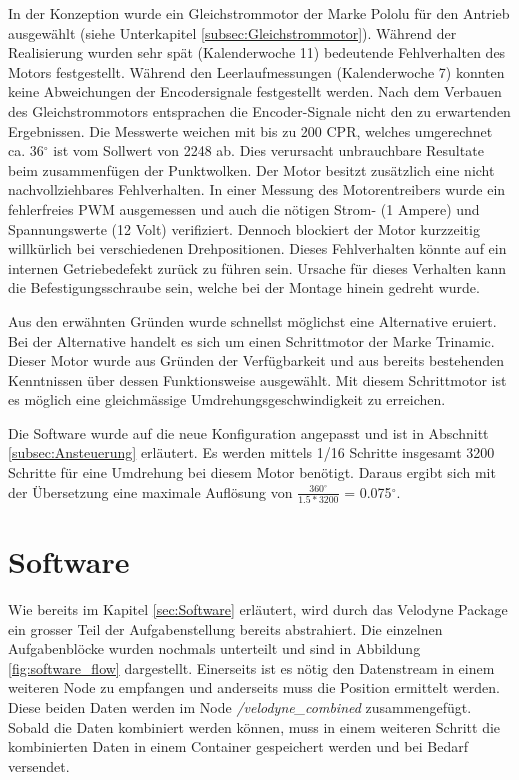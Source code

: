 In der Konzeption wurde ein Gleichstrommotor der Marke Pololu für den Antrieb ausgewählt (siehe Unterkapitel \ref{subsec:Gleichstrommotor}). Während der Realisierung wurden sehr spät (Kalenderwoche 11) bedeutende Fehlverhalten des Motors festgestellt. Während den Leerlaufmessungen (Kalenderwoche 7) konnten keine Abweichungen der Encodersignale festgestellt werden. Nach dem Verbauen des Gleichstrommotors entsprachen die Encoder-Signale nicht den zu erwartenden Ergebnissen. Die Messwerte weichen mit bis zu 200 \ac{CPR}, welches umgerechnet ca. 36$^\circ$ ist vom Sollwert von 2248 ab. Dies verursacht unbrauchbare Resultate beim zusammenfügen der Punktwolken. Der Motor besitzt zusätzlich eine nicht nachvollziehbares Fehlverhalten. In einer Messung des Motorentreibers wurde ein fehlerfreies \ac{PWM} ausgemessen und auch die nötigen Strom- (1 Ampere) und Spannungswerte (12 Volt) verifiziert. Dennoch blockiert der Motor kurzzeitig willkürlich bei verschiedenen Drehpositionen. Dieses Fehlverhalten könnte auf ein internen Getriebedefekt zurück zu führen sein. Ursache für dieses Verhalten kann die Befestigungsschraube sein, welche bei der Montage hinein gedreht wurde. 

Aus den erwähnten Gründen wurde schnellst möglichst eine Alternative eruiert. Bei der Alternative handelt es sich um einen Schrittmotor der Marke Trinamic. Dieser Motor wurde aus Gründen der Verfügbarkeit und aus bereits bestehenden Kenntnissen über dessen Funktionsweise ausgewählt. Mit diesem Schrittmotor ist es möglich eine gleichmässige Umdrehungsgeschwindigkeit zu erreichen. 

Die Software wurde auf die neue Konfiguration angepasst und ist in Abschnitt \ref{subsec:Ansteuerung} erläutert. Es werden mittels 1/16 Schritte insgesamt 3200 Schritte für eine Umdrehung bei diesem Motor benötigt. Daraus ergibt sich mit der Übersetzung eine maximale Auflösung von $\frac{360^\circ}{1.5 * 3200}$ = 0.075$^\circ$. 

\section{Software}
\label{sec:SoftwareReal}
Wie bereits im Kapitel \ref{sec:Software} erläutert, wird durch das Velodyne Package ein grosser Teil der Aufgabenstellung bereits abstrahiert. Die einzelnen Aufgabenblöcke wurden nochmals unterteilt und sind in Abbildung \ref{fig:software_flow} dargestellt. Einerseits ist es nötig den Datenstream in einem weiteren Node zu empfangen und anderseits muss die Position ermittelt werden. Diese beiden Daten werden im Node \textit{/velodyne\_combined} zusammengefügt. Sobald die Daten kombiniert werden können, muss in einem weiteren Schritt die kombinierten Daten in einem Container gespeichert werden und bei Bedarf versendet.

